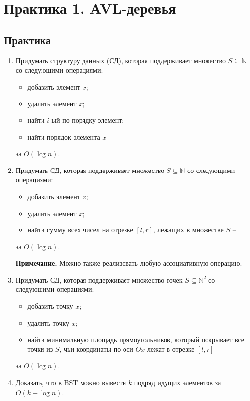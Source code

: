 \section{Практика 1. AVL-деревья}

\subsection{Практика}

\begin{enumerate}
  \item Придумать структуру данных (СД), которая поддерживает множество $S \subseteq \mathbb{N}$ со следующими операциями:
    \begin{itemize}
      \item добавить элемент $x$;
      \item удалить элемент $x$;
      \item найти $i$-ый по порядку элемент;
      \item найти порядок элемента $x$ --
    \end{itemize}  
    за $O(\log n)$.

  \item Придумать СД, которая поддерживает множество $S \subseteq \mathbb{N}$ со следующими операциями:
    \begin{itemize}
      \item добавить элемент $x$;
      \item удалить элемент $x$;
      \item найти сумму всех чисел на отрезке $[l, r]$, лежащих в множестве $S$ --
    \end{itemize}  
    за $O(\log n)$.
    
   \textbf{Примечание.} Можно также реализовать любую ассоциативную операцию.    


  \item Придумать СД, которая поддерживает множество точек $S \subseteq \mathbb{N}^2$ со следующими операциями:
    \begin{itemize}
      \item добавить точку $x$;
      \item удалить точку $x$;
      \item найти минимальную площадь прямоугольников, который покрывает все точки из $S$, чьи координаты по оси $Ox$ лежат в отрезке $[l, r]$ --
    \end{itemize}
    за $O(\log n)$.

  \item Доказать, что в BST можно вывести $k$ подряд идущих элементов за $O(k + \log n)$.

\end{enumerate}

